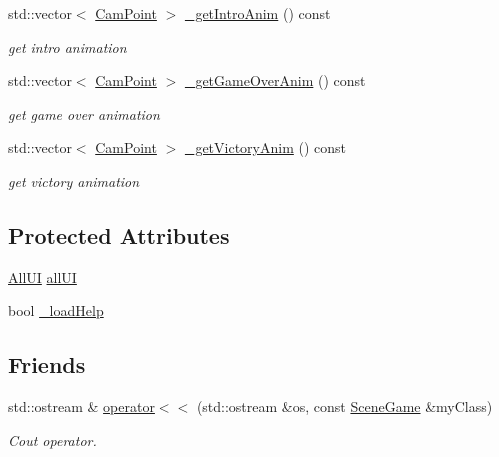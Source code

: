 \begin{DoxyCompactItemize}
std\+::vector$<$ \hyperlink{struct_cam_point}{Cam\+Point} $>$ \hyperlink{class_scene_game_ac94a0aea8920b1a1dc4324a25c2d102d}{\+\_\+get\+Intro\+Anim} () const
\begin{DoxyCompactList}\small\item\em get intro animation \end{DoxyCompactList}\item 
std\+::vector$<$ \hyperlink{struct_cam_point}{Cam\+Point} $>$ \hyperlink{class_scene_game_a02e7d9b9c93aec9665c9235ddfb212f5}{\+\_\+get\+Game\+Over\+Anim} () const
\begin{DoxyCompactList}\small\item\em get game over animation \end{DoxyCompactList}\item 
std\+::vector$<$ \hyperlink{struct_cam_point}{Cam\+Point} $>$ \hyperlink{class_scene_game_a39f1c1fd2d9948017b3c7603d2d72d1f}{\+\_\+get\+Victory\+Anim} () const
\begin{DoxyCompactList}\small\item\em get victory animation \end{DoxyCompactList}\end{DoxyCompactItemize}
\subsection*{Protected Attributes}
\begin{DoxyCompactItemize}
\item 
\hyperlink{struct_scene_game_1_1_all_u_i}{All\+UI} \hyperlink{class_scene_game_ae6a927879520686d867eee29aa67663f}{all\+UI}
\item 
bool \hyperlink{class_scene_game_ace4cb459a6b78ff4fa742972d8769460}{\+\_\+load\+Help}
\end{DoxyCompactItemize}
\subsection*{Friends}
\begin{DoxyCompactItemize}
\item 
std\+::ostream \& \hyperlink{class_scene_game_abc95c7a5340188a5cf8d86243d2369ae}{operator$<$$<$} (std\+::ostream \&os, const \hyperlink{class_scene_game}{Scene\+Game} \&my\+Class)
\begin{DoxyCompactList}\small\item\em Cout operator. \end{DoxyCompactList}\end{DoxyCompactItemize}

